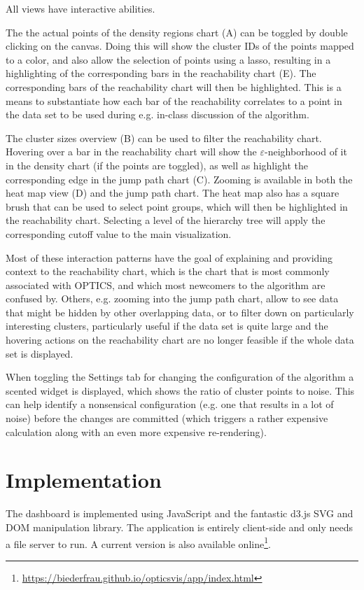 \documentclass{vgtc} %
\begin{document}
All views have interactive abilities.

The the actual points of the density regions chart (A) can be toggled by double
clicking on the canvas. Doing this will show the cluster IDs of the points
mapped to a color, and also allow the selection of points using a lasso,
resulting in a highlighting of the corresponding bars in the reachability chart
(E). The corresponding bars of the reachability chart will then be highlighted.
This is a means to substantiate how each bar of the reachability correlates to
a point in the data set to be used during e.g.  in-class discussion of the
algorithm.

The cluster sizes overview (B) can be used to filter the
reachability chart. Hovering over a bar in the reachability chart will show the
$\varepsilon$-neighborhood of it in the density chart (if the points are
toggled), as well as highlight the corresponding edge in the jump path chart
(C). Zooming is available in both the heat map view (D) and the jump path chart.
The heat map also has a square brush that can be used to select point groups,
which will then be highlighted in the reachability chart. Selecting a level of the
hierarchy tree will apply the corresponding cutoff value to the main visualization.

Most of these interaction patterns have the goal of explaining and providing
context to the reachability chart, which is the chart that is most commonly
associated with OPTICS, and which most newcomers to the algorithm are confused
by. Others, e.g. zooming into the jump path chart, allow to see data that might
be hidden by other overlapping data, or to filter down on particularly
interesting clusters, particularly useful if the data set is quite large and
the hovering actions on the reachability chart are no longer feasible if the
whole data set is displayed.

When toggling the Settings tab for changing the configuration of the algorithm
a scented widget is displayed, which shows the ratio of cluster points to
noise.  This can help identify a nonsensical configuration (e.g. one that
results in a lot of noise) before the changes are committed (which triggers a
rather expensive calculation along with an even more expensive re-rendering).

\section{Implementation} %

The dashboard is implemented using JavaScript and the fantastic d3.js SVG and DOM
manipulation library. The application is entirely client-side and only needs a
file server to run. A current version is also available
online\footnote{\url{https://biederfrau.github.io/opticsvis/app/index.html}}.
\end{document}
